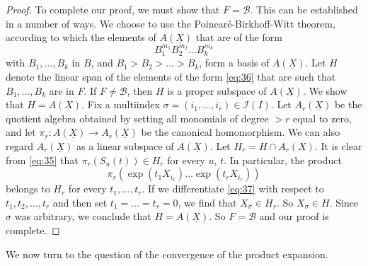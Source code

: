 \documentclass[leqno]{article}
\theoremstyle{plain}
\begin{document}
\begin{proof}
	To complete our proof, we must show that $F=\mathcal{B}$. 
	This can be established in a number of ways. 
	We choose to use the Poincaré-Birkhoff-Witt theorem, according to which the elements of $A(\underline{X})$ that are of the form
	\begin{equation} \label{eq:36}
		B_{1}^{m_{1}} B_{2}^{m_2} \ldots B_{k}^{m_{k}}
	\end{equation}
	with $B_{1}, \ldots, B_{k}$ in $B$, and $B_{1}>B_{2}>\ldots>B_{k}$, form a basis of $A(\underline{X})$.
	Let $H$ denote the linear span of the elements of the form \eqref{eq:36} that are such that $B_{1}, \ldots, B_{k}$ are in $F$.
	If $F \neq \mathcal{B}$, then $H$ is a proper subspace of $A(\underline{X})$. We show that $H=A(\underline{X})$. Fix a multiindex $\sigma=\left(i_{1}, \ldots, i_{r}\right) \in \mathcal{I}(I)$. 
	Let $A_{r}(\underline{X})$ be the quotient algebra obtained by setting all monomials of degree $>r$ equal to zero, and let $\pi_{r}: A(\underline{X}) \rightarrow A_{r}(\underline{X})$ be the canonical homomorphism. 
	We can also regard $A_{r}(\underline{X})$ as a linear subspace of $A(\underline{X})$. 
	Let $H_{r}=H \cap A_{r}(X)$.
	It is clear from \eqref{eq:35} that $\pi_{r}\left(S_{u}(t)\right) \in H_{r}$ for every $u$, $t$. In particular, the product
	\begin{equation} \label{eq:37}
		\pi_{r}\left(\exp \left(t_{1} X_{i_{1}}\right) \ldots \exp \left(t_{r} X_{i_{r}}\right)\right)
	\end{equation}
	belongs to $H_{r}$ for every $t_{1}, \ldots, t_{r}$. If we differentiate \eqref{eq:37} with respect to $t_{1}, t_{2}, \ldots, t_{r}$ and then set $t_{1}=\ldots=t_{r}=0$, we find that $X_{\sigma} \in H_{r}$. 
	So $X_{\sigma} \in H$. 
	Since $\sigma$ was arbitrary, we conclude that $H=A(\underline{X})$. 
	So $F=\mathcal{B}$ and our proof is complete.
\end{proof}

We now turn to the question of the convergence of the product expansion. 
\end{document}
